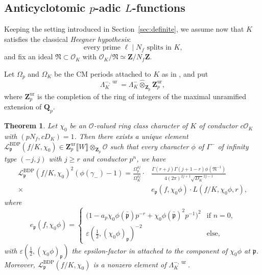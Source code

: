 \documentclass[10pt,letterpaper]{amsart}
\theoremstyle{plain}
\newtheorem{thm}{Theorem}[subsection] %
\theoremstyle{definition}
\theoremstyle{definition}
\theoremstyle{plain}
\theoremstyle{plain}
\theoremstyle{plain}
\theoremstyle{remark}
\numberwithin{equation}{section}
\newcommand{\pp}{\mathfrak{p}}
\DeclareMathOperator{\ur}{\mathrm{ur}}
\DeclareMathOperator{\BDP}{BDP} %
\def\cO{\mathcal O}
\newcommand{\Q}{\mathbf{Q}}
\newcommand{\Z}{\mathbf{Z}}
\newcommand{\dBr}[1]{\llbracket{#1}\rrbracket}
\begin{document}
\subsection{Anticyclotomic \texorpdfstring{$p$}{p}-adic \texorpdfstring{$L$}{L}-functions}
\label{subsec:Lp-indef}

Keeping the setting introduced in Section~\ref{sec:definite}, 
we assume now that $K$ satisfies the classical \emph{Heegner hypothesis}:
\begin{equation}\label{eq:Heeg}
\textrm{every prime $\ell\mid N_f$ splits in $K$,}\tag{Heeg}
\end{equation}
and fix an ideal $\mathfrak{N}\subset\cO_K$ with $\cO_K/\mathfrak{N}\simeq\Z/N_f\Z$. 

Let $\Omega_p$ and $\Omega_K$ be the CM periods attached to $K$ as in \cite[\S{2.5}]{cas-hsieh1}, and put  
\[
\Lambda_{K}^{-,\ur}=\Lambda_K^-\hat\otimes_{\Z_p}\Z_p^{\ur},
\]
where $\Z_p^{\ur}$ is the completion of the ring of integers of the maximal unramified extension of $\Q_p$.

\begin{thm}\label{thm:BDP}
Let $\chi_0$ be an $\cO$-valued ring class character of $K$ of conductor $c\cO_K$ with $(pN_f,cD_K)=1$. Then there exists a unique element 
$\mathscr{L}_\pp^{\BDP}(f/K,\chi_0)\in\Z_p^{\ur}\dBr{W}\otimes_{\Z_p}\cO$ such that every character $\phi$ of $\Gamma^-$ of infinity type $(-j,j)$ with $j\geq r$ and conductor $p^n$, we have
\begin{align*}
\mathscr{L}_\pp^{\BDP}(f/K,\chi_0)^2(\phi(\gamma_-)-1)=\frac{\Omega_p^{4j}}{\Omega_K^{4j}}\cdot&\frac{\Gamma(r+j)\Gamma(j+1-r)\phi(\mathfrak{N}^{-1})}{4(2\pi)^{2j+1}\sqrt{D_K}^{2j-1}}\\
\times &e_\pp(f,\chi_0\phi)\cdot L(f/K,\chi_0\phi,r),
\end{align*} 
where
\[
e_\pp(f,\chi_0\phi)=\begin{cases}
\bigl(1-a_p\chi_0\phi(\bar{\pp})p^{-r}+\chi_0\phi(\bar{\pp})^2p^{-1}\bigr)^2&\textrm{if  $n=0$,}\\[0.3em]
\varepsilon(\frac{1}{2},(\chi_0\phi)_\pp)^{-2}&\textrm{else},
\end{cases}  
\]
with $\varepsilon(\frac{1}{2},(\chi_0\phi)_\pp)$ the epsilon-factor in \cite[p.\,570]{cas-hsieh1} attached to the component of $\chi_0\phi$ at $\pp$. 
Moreover, $\mathscr{L}_\pp^{\BDP}(f/K,\chi_0)$ is a nonzero element of $\Lambda_K^{-,{\ur}}$.
\end{thm}
\end{document}

